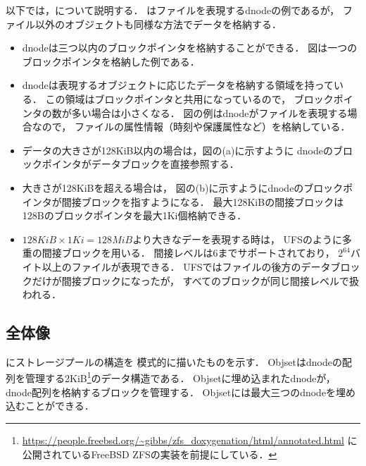 以下では，について説明する．
はファイルを表現するdnodeの例であるが，
ファイル以外のオブジェクトも同様な方法でデータを格納する．

\begin{itemize}
\item dnodeは三つ以内のブロックポインタを格納することができる．
  図は一つのブロックポインタを格納した例である．
\item dnodeは表現するオブジェクトに応じたデータを格納する領域を持っている．
  この領域はブロックポインタと共用になっているので，
  ブロックポインタの数が多い場合は小さくなる．
  図の例はdnodeがファイルを表現する場合なので，
  ファイルの属性情報（時刻や保護属性など）を格納している．
\item データの大きさが128KiB以内の場合は，図の(a)に示すように
  dnodeのブロックポインタがデータブロックを直接参照する．
\item 大きさが128KiBを超える場合は，
  図の(b)に示すようにdnodeのブロックポインタが間接ブロックを指すようになる．
  最大128KiBの間接ブロックは128Bのブロックポインタを最大1Ki個格納できる．
\item $128KiB \times 1Ki = 128MiB$より大きなデーを表現する時は，
  UFSのように多重の間接ブロックを用いる．
  間接レベルは6までサポートされており，
  $2^{64}$バイト以上のファイルが表現できる．
  UFSではファイルの後方のデータブロックだけが間接ブロックになったが，
  すべてのブロックが同じ間接レベルで扱われる．
\end{itemize}

\subsection{全体像}
にストレージプールの構造を
模式的に描いたものを示す．
Objsetはdnodeの配列を管理する2KiB\footnote{
\url{https://people.freebsd.org/~gibbs/zfs_doxygenation/html/annotated.html}
に公開されているFreeBSD ZFSの実装を前提にしている．
}のデータ構造である．
Objsetに埋め込まれたdnodeが，dnode配列を格納するブロックを管理する．
Objsetには最大三つのdnodeを埋め込むことができる．

